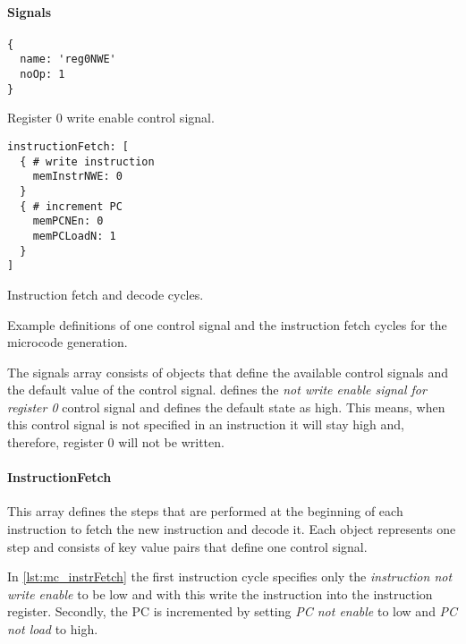\paragraph{Signals}
\begin{listing}[t]
\begin{sublisting}[b]{.5\textwidth}
  \begin{verbatim}
{
  name: 'reg0NWE'
  noOp: 1
}
  \end{verbatim}
  \caption{Register 0 write enable control signal.}
  \label{lst:mc_signals}
\end{sublisting}
\begin{sublisting}[b]{.45\textwidth}
  \begin{verbatim}
instructionFetch: [
  { # write instruction
    memInstrNWE: 0
  }
  { # increment PC
    memPCNEn: 0
    memPCLoadN: 1
  }
]
  \end{verbatim}
  \caption{Instruction fetch and decode cycles.}
  \label{lst:mc_instrFetch}
\end{sublisting}
\caption{Example definitions of one control signal and the instruction fetch cycles for the microcode generation.}
\end{listing}
The signals array consists of objects that define the available control signals and the default value of the control signal.
 defines the \emph{not write enable signal for register 0} control signal and defines the default state as high.
This means, when this control signal is not specified in an instruction it will stay high and, therefore, register 0 will not be written.

\paragraph{InstructionFetch} This array defines the steps that are performed at the beginning of each instruction to fetch the new instruction and decode it.
Each object represents one step and consists of key value pairs that define one control signal.

In \cref{lst:mc_instrFetch} the first instruction cycle specifies only the \emph{instruction not write enable} to be low and with this write the instruction into the instruction register.
Secondly, the \gls{PC} is incremented by setting \emph{PC not enable} to low and \emph{PC not load} to high.

